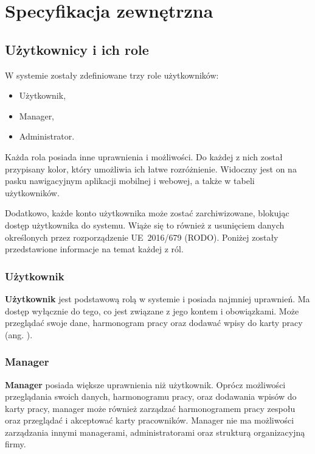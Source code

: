 \chapter{Specyfikacja zewnętrzna}
\label{ch:04}

\section{Użytkownicy i ich role}

W systemie zostały zdefiniowane trzy role użytkowników:

\begin{itemize}
    \item Użytkownik,
    \item Manager,
    \item Administrator.
\end{itemize}

Każda rola posiada inne uprawnienia i możliwości. Do każdej z nich został przypisany kolor, który umożliwia ich łatwe rozróżnienie. Widoczny jest on na pasku nawigacyjnym aplikacji mobilnej i webowej, a także w tabeli użytkowników.

Dodatkowo, każde konto użytkownika może zostać zarchiwizowane, blokując dostęp użytkownika do systemu. Wiąże się to również z usunięciem danych określonych przez rozporządzenie UE~2016/679 (RODO). Poniżej zostały przedstawione informacje na temat każdej z ról.


\subsection{Użytkownik}

\textbf{Użytkownik} jest podstawową rolą w systemie i posiada najmniej uprawnień. Ma dostęp wyłącznie do tego, co jest związane z jego kontem i obowiązkami. Może przeglądać swoje dane, harmonogram pracy oraz dodawać wpisy do karty pracy (ang. ).

\subsection{Manager}

\textbf{Manager} posiada większe uprawnienia niż użytkownik. Oprócz możliwości przeglądania swoich danych, harmonogramu pracy, oraz dodawania wpisów do karty pracy, manager może również zarządzać harmonogramem pracy zespołu oraz przeglądać i akceptować karty pracowników. Manager nie ma możliwości zarządzania innymi managerami, administratorami oraz strukturą organizacyjną firmy.

